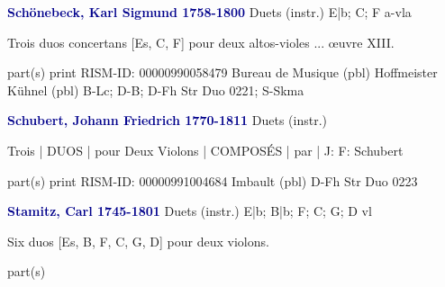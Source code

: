 \documentclass[twocolumn]{book}
\begin{document}
\newline \par \vspace{7pt} \textcolor{darkblue}{\textbf{Schönebeck, Karl Sigmund  1758-1800}}
\newline Duets (instr.)  E|b; C; F  
 a-vla
\newline \begin{itshape}Trois duos concertans [Es, C, F] pour deux altos-violes ... œuvre XIII.\end{itshape} 
\newline \textcolor{darkblue}{}  part(s)  
\newline print
\newline RISM-ID: 00000990058479
\newline Bureau de Musique  (pbl)
\newline Hoffmeister  Kühnel  (pbl)
\newline B-Lc; D-B; D-Fh  Str Duo 0221; S-Skma
\newline \par \vspace{7pt} \textcolor{darkblue}{\textbf{Schubert, Johann Friedrich  1770-1811}}
\newline Duets (instr.)    
\newline \begin{itshape}Trois | DUOS | pour Deux Violons | COMPOSÉS | par | J: F: Schubert\end{itshape} 
\newline \textcolor{darkblue}{}  part(s)  
\newline print
\newline RISM-ID: 00000991004684
\newline Imbault  (pbl)
\newline D-Fh  Str Duo 0223
\newline \par \vspace{7pt} \textcolor{darkblue}{\textbf{Stamitz, Carl  1745-1801}}
\newline Duets (instr.)  E|b; B|b; F; C; G; D  
 vl
\newline \begin{itshape}Six duos [Es, B, F, C, G, D] pour deux violons.\end{itshape} 
\newline \textcolor{darkblue}{}  part(s)  
\end{document}
